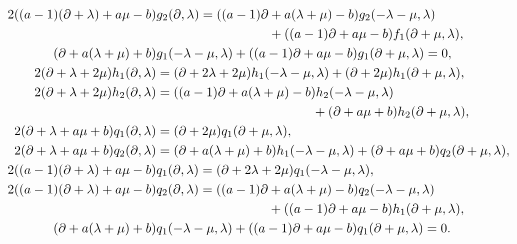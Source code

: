 \documentclass[11pt,letterpaper,reqno]{amsart}
\theoremstyle{definition}
\numberwithin{equation}{section}
\begin{document}
\begin{align}
2((a-1)(\partial+\lambda)+a{\mu}-b)&g_2(\partial, \lambda)=((a-1)\partial+a{(\lambda+\mu)}-b)g_2(-\lambda-\mu, \lambda)\nonumber\\
&\hphantom{g_2(\partial, \lambda)=((a-1)\partial}+((a-1)\partial+a{\mu}-b)f_1(\partial+\mu, \lambda),\label{yyy29}\\
(\partial+a(\lambda+\mu)+b)&g_1(-\lambda-\mu, \lambda)+((a-1)\partial+a{\mu}-b)g_1(\partial+\mu, \lambda)=0,\label{yyy30}\\
2(\partial+\lambda+2\mu)h_1(\partial, \lambda)&=(\partial+2\lambda+2\mu)h_1(-\lambda-\mu, \lambda)+(\partial+2\mu)h_1(\partial+\mu, \lambda),\label{yyy31}\\
2(\partial+\lambda+2\mu)h_2(\partial, \lambda)&=((a-1)\partial+a{(\lambda+\mu)}-b)h_2(-\lambda-\mu, \lambda)\nonumber\\
&\hphantom{=((a-1)\partial+a{(\lambda+\mu)}-b)} +(\partial+a\mu+b)h_2(\partial+\mu, \lambda),\label{yyy32}\\
2(\partial+\lambda+a\mu+b)q_1(\partial, \lambda)&=(\partial+2\mu)q_1(\partial+\mu, \lambda),\label{yyy33}\\
2(\partial+\lambda+a\mu+b)q_2(\partial, \lambda)&=(\partial+a(\lambda+\mu)+b)h_1(-\lambda-\mu, \lambda)+(\partial+a\mu+b)q_2(\partial+\mu, \lambda),\label{yyy34}\\
2((a-1)(\partial+\lambda)+a{\mu}-b)&q_1(\partial, \lambda)=(\partial+2\lambda+2\mu)q_1(-\lambda-\mu, \lambda),\label{yyy35}\\
2((a-1)(\partial+\lambda)+a{\mu}-b)&q_2(\partial, \lambda)=((a-1)\partial+a{(\lambda+\mu)}-b)q_2(-\lambda-\mu, \lambda)\nonumber\\
&\hphantom{q_2(\partial, \lambda)=((a-1)\partial} +((a-1)\partial+a{\mu}-b)h_1(\partial+\mu, \lambda),\label{yyy36}\\
(\partial+a(\lambda+\mu)+b)&q_1(-\lambda-\mu, \lambda)+((a-1)\partial+a{\mu}-b)q_1(\partial+\mu, \lambda)=0.\label{yyy37}
\end{align}
\end{document}
